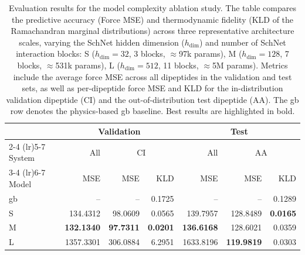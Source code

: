 \begin{table}[htbp]
\centering
\caption{Evaluation results for the model complexity ablation study. The table compares the predictive accuracy (Force MSE) and thermodynamic fidelity (KLD of the Ramachandran marginal distributions) across three representative architecture scales, varying the SchNet hidden dimension ($h_{\text{dim}}$) and number of SchNet interaction blocks: S ($h_{\text{dim}}=32$, 3 blocks, $\approx$97k params), M ($h_{\text{dim}}=128$, 7 blocks, $\approx$531k params), L ($h_{\text{dim}}=512$, 11 blocks, $\approx$5M params). Metrics include the average force MSE across all dipeptides in the validation and test sets, as well as per-dipeptide force MSE and KLD for the in-distribution validation dipeptide (CI) and the out-of-distribution test dipeptide (AA). The \gls{gb} row denotes the physics-based \gls{gb} baseline. Best results are highlighted in bold.}
\label{tab:complexity_ablation}
\begin{tabular}{l r r r r r r}
\toprule
& \multicolumn{3}{c}{Validation} & \multicolumn{3}{c}{Test} \\
\cmidrule(lr){2-4} \cmidrule(lr){5-7}
System & All & \multicolumn{2}{c}{CI} & All & \multicolumn{2}{c}{AA} \\
\cmidrule(lr){3-4} \cmidrule(lr){6-7}
Model & MSE & MSE & KLD & MSE & MSE & KLD \\
\midrule
\gls{gb} & -- & -- & 0.1725 & -- & -- & 0.1289 \\
\midrule
S & 134.4312 & 98.0609 & 0.0565 & 139.7957 & 128.8489 & \textbf{0.0165} \\
M & \textbf{132.1340} & \textbf{97.7311} & \textbf{0.0201} & \textbf{136.6168} & 128.6021 & 0.0359 \\
L & 1357.3301 & 306.0884 & 6.2951 & 1633.8196 & \textbf{119.9819} & 0.0303 \\
\bottomrule
\end{tabular}
\end{table}


